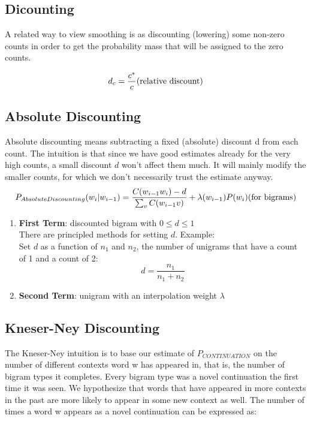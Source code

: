 \subsection{Dicounting \cite{nlp-1}}
A related way to view smoothing is as discounting (lowering) some non-zero counts in order to get the probability mass that will be assigned to the zero counts.


\[
    d_c = \displaystyle\dfrac{c^*}{c}  \hfill \text{(relative discount)}
\]

\subsection{Absolute Discounting}
Absolute discounting means subtracting a fixed (absolute) discount d from each count. The intuition is that since we have good estimates already for the very high counts, a small discount $d$ won’t affect them much. It will mainly modify the smaller counts, for which we don’t necessarily trust the estimate anyway. 
\[
    P_{AbsoluteDiscounting}(w_i|w_{i-1}) = \displaystyle\dfrac{C(w_{i-1}w_i)-d}{\sum_v C(w_{i-1} v)} + \lambda (w_{i-1})P(w_i) \hfill \text{(for bigrams)}
\]

\begin{enumerate}
    \item \textbf{First Term}: discounted bigram with $0 \leq d \leq 1$\\
    There are principled methods for setting $d$. Example:\\
    Set $d$ as a function of $n_1$ and $n_2$, the number of unigrams that have a count of 1 and a count of 2:\\
    \[
        d = \displaystyle\dfrac{n_1}{n_1 + n_2}
    \]
    \item \textbf{Second Term}: unigram with an interpolation weight $\lambda$
\end{enumerate}

\subsection{Kneser-Ney Discounting}\label{Kneser-Ney Discounting}
The Kneser-Ney intuition is to base our estimate of $P_{CONTINUATION}$ on the number of different contexts word w has appeared in, that is, the number of bigram types it completes. Every bigram type was a novel continuation the first time it was seen. We hypothesize that words that have appeared in more contexts in the
past are more likely to appear in some new context as well. The number of times a word w appears as a novel continuation can be expressed as:

